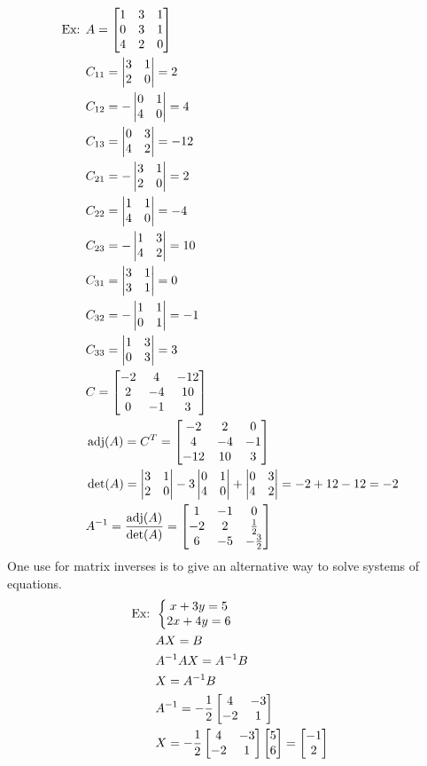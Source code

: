 \documentclass[11pt, fleqn]{article}
\begin{document}
\begin{align*}
    \text{Ex: }&A=\matrixx{1&3&1\\0&3&1\\4&2&0}\\
    &C_{11}=\detmatrix{3&1\\2&0}=2\\
    &C_{12}=-\detmatrix{0&1\\4&0}=4\\
    &C_{13}=\detmatrix{0&3\\4&2}=-12\\
    &C_{21}=-\detmatrix{3&1\\2&0}=2\\
    &C_{22}=\detmatrix{1&1\\4&0}=-4\\
    &C_{23}=-\detmatrix{1&3\\4&2}=10\\
    &C_{31}=\detmatrix{3&1\\3&1}=0\\
    &C_{32}=-\detmatrix{1&1\\0&1}=-1\\
    &C_{33}=\detmatrix{1&3\\0&3}=3\\
    &C=\matrixx{-2&4&-12\\2&-4&10\\0&-1&3}\\
    &\adj(A)=C^T=\matrixx{-2&2&0\\4&-4&-1\\-12&10&3}\\
    &\det(A)=\detmatrix{3&1\\2&0}-3\detmatrix{0&1\\4&0}+\detmatrix{0&3\\4&2}=-2+12-12=-2\\
    &A^{-1}=\frac{\adj(A)}{\det(A)}=\matrixx{1&-1&0\\-2&2&\frac{1}{2}\\6&-5&-\frac{3}{2}}
\end{align*}
One use for matrix inverses is to give an alternative way to solve systems of equations.
\begin{align*}
    \text{Ex: }&\eqnsystem{x+3y=5\\2x+4y=6}\\
    &AX=B\\
    &A^{-1}AX=A^{-1}B\\
    &X=A^{-1}B\\
    &A^{-1}=-\frac{1}{2}\matrixx{4&-3\\-2&1}\\
    &X=-\frac{1}{2}\matrixx{4&-3\\-2&1}\matrixx{5\\6}=\matrixx{-1\\2}
\end{align*}
\end{document}
